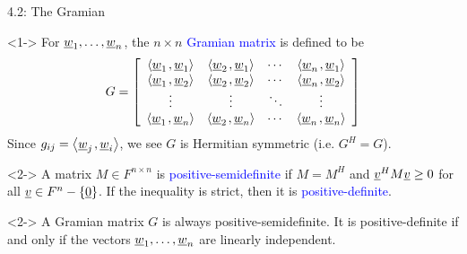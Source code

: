 \documentclass[10pt,english,aspectratio=169]{beamer}
\begin{document}
\begin{frame}{4.2: The Gramian}

\vspace{-1.5mm}

\begin{definition}<1->
For $\underline{w}_1,\ldots,\underline{w}_n$, the $n \times n$ \textcolor{blue}{Gramian matrix} is defined to be \vspace{-2mm}
\begin{equation*}
G = \left[ \begin{array}{cccc}
\inner{ \vecnot{w}_1 }{ \vecnot{w}_1 }
& \inner{ \vecnot{w}_2 }{ \vecnot{w}_1 } & \cdots
& \inner{ \vecnot{w}_n }{ \vecnot{w}_1 } \\
\inner{ \vecnot{w}_1 }{ \vecnot{w}_2 }
& \inner{ \vecnot{w}_2 }{ \vecnot{w}_2 } & \cdots
& \inner{ \vecnot{w}_n }{ \vecnot{w}_2 } \\
\vdots & \vdots & \ddots & \vdots \\
\inner{ \vecnot{w}_1 }{ \vecnot{w}_n }
& \inner{ \vecnot{w}_2 }{ \vecnot{w}_n } & \cdots
& \inner{ \vecnot{w}_n }{ \vecnot{w}_n }
\end{array} \right] \vspace{-1mm}
\end{equation*}
Since $g_{ij} = \smash{{\left\langle  \underline{w}_j  \mskip2mu ,  \underline{w}_i  \right\rangle}}$, we see $G$ is Hermitian symmetric (i.e. $G^H = G$).
\end{definition}

\vspace{-1mm}

\begin{definition}<2->
A matrix $M\in F^{n \times n}$ is \textcolor{blue}{positive-semidefinite} if $M=M^H$ and $\underline{v}^H M \underline{v} \geq 0$ for all $\underline{v} \in F^n - \left\{ \underline{0} \right\}$.
If the inequality is strict, then it is \textcolor{blue}{positive-definite}.
\end{definition}

\vspace{-1mm}

\begin{theorem}<2->
A Gramian matrix $G$ is always positive-semidefinite.
It is positive-definite if and only if the vectors $\underline{w}_1, \ldots, \underline{w}_n$ are linearly independent.
\end{theorem}
\vspace{-1mm}


\end{frame}
\end{document}

